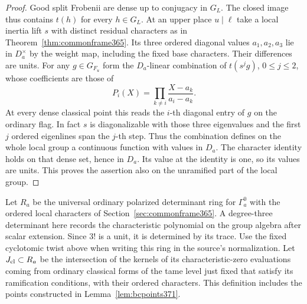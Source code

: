 \documentclass[a4paper,11pt]{article}
\theoremstyle{definition}
\theoremstyle{remark}
\numberwithin{equation}{section}
\begin{document}
\begin{proof}
Good split Frobenii are dense up to conjugacy in \(G_L\).
The closed image thus contains \(t(h)\) for every \(h\in G_L\).
At an upper place \(u\mid\ell\) take a local inertia lift \(s\)
with distinct residual characters as in
Theorem~\ref{thm:commonframe365}. Its three ordered diagonal
values \(a_1,a_2,a_3\) lie in \(D_a^\times\) by the weight
map, including the fixed base characters. Their differences
are units. For any \(g\in G_{F_u}\) form the \(D_a\)-linear
combination of \(t(s^j g)\), \(0\le j\le2\), whose coefficients
are those of
\[
                    P_i(X)=\prod_{k\ne i}\frac{X-a_k}{a_i-a_k}.
\]
At every dense classical point this reads the \(i\)-th
diagonal entry of \(g\) on the ordinary flag. In fact \(s\)
is diagonalizable with those three eigenvalues and the first
\(j\) ordered eigenlines span the \(j\)-th step. Thus the
combination defines on the whole local group a continuous
function with values in \(D_a\). The character identity
holds on that dense set, hence in \(D_a\). Its value at
the identity is one, so its values are units. This proves
the assertion also on the unramified part of the local group.
\end{proof}

Let \(R_a\) be the universal ordinary polarized determinant
ring for \(\Gamma_a^0\) with the ordered local characters of
Section~\ref{sec:commonframe365}. A degree-three determinant
here records the characteristic polynomial on the group
algebra after scalar extension. Since \(3!\) is a unit, it
is determined by its trace. Use the fixed cyclotomic twist
above when writing this ring in the source's normalization.
Let \(J_{\rm cl}\subset R_a\) be the intersection of the
kernels of its characteristic-zero evaluations coming from
ordinary classical forms of the tame level just fixed that
satisfy its ramification conditions, with their ordered
characters. This definition includes the points constructed
in Lemma~\ref{lem:bcpoints371}.
\end{document}

